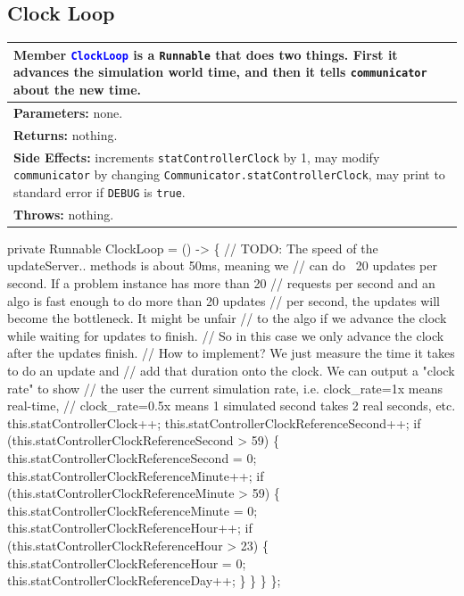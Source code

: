 \subsection{Clock Loop}
\begin{tabular}{p{\textwidth}}
\toprule
\rowcolor{TableTitle}
Member \textcolor{blue}{{\tt{}ClockLoop}} is a {\tt{}Runnable} that does two things.
First it advances the simulation world time, and then it tells {\tt{}communicator}
about the new time.\\
\midrule
\textbf{Parameters:} none.\\
\textbf{Returns:} nothing.\\
\textbf{Side Effects:} increments {\tt{}statControllerClock} by 1, may modify
{\tt{}communicator} by changing {\tt{}Communicator.statControllerClock}, may print to
standard error if {\tt{}DEBUG} is {\tt{}true}.\\
\textbf{Throws:} nothing.\\
\bottomrule
\end{tabular}
\nwenddocs{}\endmoddef{}
private Runnable ClockLoop = () -> \{
  // TODO: The speed of the updateServer.. methods is about 50ms, meaning we
  // can do ~20 updates per second. If a problem instance has more than 20
  // requests per second and an algo is fast enough to do more than 20 updates
  // per second, the updates will become the bottleneck. It might be unfair
  // to the algo if we advance the clock while waiting for updates to finish.
  // So in this case we only advance the clock after the updates finish.
  // How to implement? We just measure the time it takes to do an update and
  // add that duration onto the clock. We can output a "clock rate" to show
  // the user the current simulation rate, i.e. clock_rate=1x means real-time,
  // clock_rate=0.5x means 1 simulated second takes 2 real seconds, etc.
  this.statControllerClock++;
  this.statControllerClockReferenceSecond++;
  if (this.statControllerClockReferenceSecond > 59) \{
    this.statControllerClockReferenceSecond = 0;
    this.statControllerClockReferenceMinute++;
    if (this.statControllerClockReferenceMinute > 59) \{
      this.statControllerClockReferenceMinute = 0;
      this.statControllerClockReferenceHour++;
      if (this.statControllerClockReferenceHour > 23) \{
        this.statControllerClockReferenceHour = 0;
        this.statControllerClockReferenceDay++;
      \}
    \}
  \}
\};
\nwendcode{}\nwdocspar

